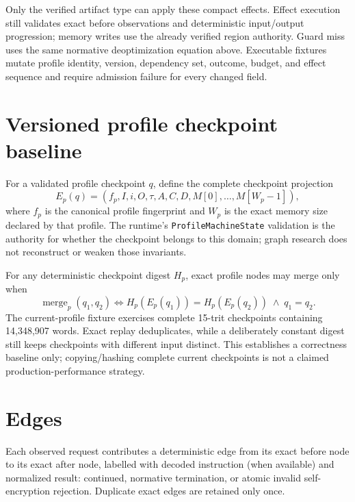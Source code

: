 \documentclass{article}
\begin{document}
Only the verified artifact type can apply these compact effects. Effect
execution
still validates exact before observations and deterministic input/output
progression; memory writes use the already verified region authority. Guard miss
uses the same normative deoptimization equation above. Executable fixtures
mutate
profile identity, version, dependency set, outcome, budget, and effect sequence
and require admission failure for every changed field.

\section{Versioned profile checkpoint baseline}

For a validated profile checkpoint $q$, define the complete checkpoint
projection
\begin{equation}
  E_p(q)=\left(
    f_p,I,i,O,\tau,A,C,D,M[0],\ldots,M[W_p-1]
  \right),
  \label{eq:state-graph-profile-checkpoint}
\end{equation}
where $f_p$ is the canonical profile fingerprint and $W_p$ is the exact memory
size declared by that profile. The runtime's \texttt{ProfileMachineState}
validation is
the authority for whether the checkpoint belongs to this domain; graph research
does not reconstruct or weaken those invariants.

For any deterministic checkpoint digest $H_p$, exact profile nodes may merge
only
when
\begin{equation}
  \operatorname{merge}_p(q_1,q_2)
    \Longleftrightarrow
    H_p(E_p(q_1))=H_p(E_p(q_2))\;\land\;q_1=q_2.
  \label{eq:state-graph-profile-collision-safe-merge}
\end{equation}
The current-profile fixture exercises complete 15-trit checkpoints containing
14,348,907 words. Exact replay deduplicates, while a deliberately constant
digest still keeps checkpoints with different input distinct. This establishes a
correctness baseline only; copying/hashing complete current checkpoints is not a
claimed production-performance strategy.

\section{Edges}

Each observed request contributes a deterministic edge from its exact before
node to its exact after node, labelled with decoded instruction (when available)
and normalized result: continued, normative termination, or atomic invalid
self-encryption rejection. Duplicate exact edges are retained only once.
\end{document}
